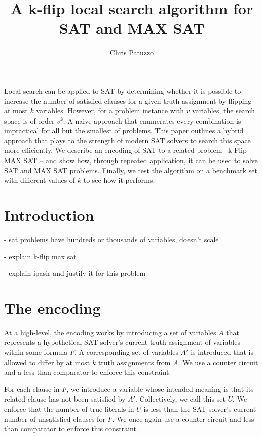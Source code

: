 \documentclass{article}
\begin{document}
\title{A k-flip local search algorithm for SAT and MAX SAT}
\author{Chris Patuzzo}
\maketitle

\abstract
Local search can be applied to SAT by determining whether it is possible to
increase the number of satisfied clauses for a given truth assignment by
flipping at most $k$ variables. However, for a problem instance with $v$
variables, the search space is of order $v^k$. A naive approach that enumerates
every combination is impractical for all but the smallest of problems. This
paper outlines a hybrid approach that plays to the strength of modern SAT
solvers to search this space more efficiently. We describe an encoding of SAT
to a related problem –\linebreak k-Flip MAX SAT – and show how, through repeated
application, it can be used to solve SAT and MAX SAT problems. Finally, we test
the algorithm on a benchmark set with different values of $k$ to see how it
performs.

\section{Introduction}
- sat problems have hundreds or thousands of variables, doesn't scale

- explain k-flip max sat

- explain ipasir and justify it for this problem

\section{The encoding}

At a high-level, the encoding works by introducing a set of variables $A$ that
represents a hypothetical SAT solver's current truth assignment of variables
within some formula $F$. A corresponding set of variables $A'$ is introduced
that is allowed to differ by at most $k$ truth assignments from $A$.  We use a
counter circuit and a less-than comparator to enforce this constraint.

For each clause in $F$, we introduce a variable whose intended meaning is that
its related clause has not been satisfied by $A'$. Collectively, we call this
set $U$. We enforce that the number of true literals in $U$ is less than the
SAT solver's current number of unsatisfied clauses for $F$. We once again use a
counter circuit and less-than comparator to enforce this constraint.
\end{document}
